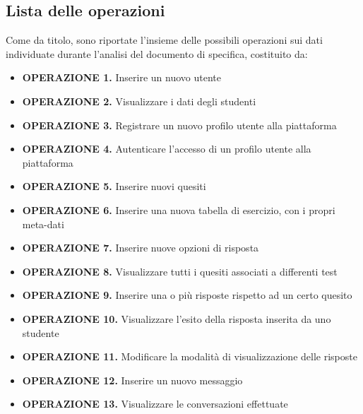 \documentclass{article}
\begin{document}
\subsection{Lista delle operazioni}
\large
Come da titolo, sono riportate l'insieme delle possibili operazioni sui dati individuate durante l'analisi del documento di specifica, costituito da: 
\begin{itemize}[label={ }]
    \itemsep1px
    \item {\small\bf{OPERAZIONE 1.}} \hspace*{1px} Inserire un nuovo utente
    \item {\small\bf{OPERAZIONE 2.}} \hspace*{1px} Visualizzare i dati degli studenti 
    \item {\small\bf{OPERAZIONE 3.}} \hspace*{1px} Registrare un nuovo profilo utente alla piattaforma 
    \item {\small\bf{OPERAZIONE 4.}} \hspace*{1px} Autenticare l'accesso di un profilo utente alla piattaforma
    \item {\small\bf{OPERAZIONE 5.}} \hspace*{1px} Inserire nuovi quesiti 
    \item {\small\bf{OPERAZIONE 6.}} \hspace*{1px} Inserire una nuova tabella di esercizio, con i propri meta-dati 
    \item {\small\bf{OPERAZIONE 7.}} \hspace*{1px} Inserire nuove opzioni di risposta
    \item {\small\bf{OPERAZIONE 8.}} \hspace*{1px} Visualizzare tutti i quesiti associati a differenti test 
    \item {\small\bf{OPERAZIONE 9.}} \hspace*{1px} Inserire una o più risposte rispetto ad un certo quesito 
    \item {\small\bf{OPERAZIONE 10.}} Visualizzare l'esito della risposta inserita da uno studente
    \item {\small\bf{OPERAZIONE 11.}} Modificare la modalità di visualizzazione delle risposte
    \item {\small\bf{OPERAZIONE 12.}} Inserire un nuovo messaggio 
    \item {\small\bf{OPERAZIONE 13.}} Visualizzare le conversazioni effettuate
\end{itemize}
\end{document}
